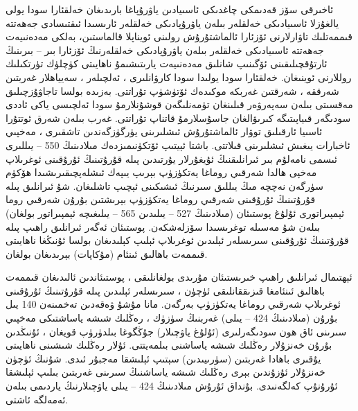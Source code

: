 \documentclass[a4paper]{article}
\begin{document}
ئاخىرقى سۆز قەدىمكى چاغدىكى ئاسىيادىن ياۋرۇپاغا بارىدىغان خەلقئارا سودا يولى يالغۇزلا ئاسىيادىكى خەلقلەر بىلەن ياۋرۇپادىكى خەلقلەر ئارىسىدا ئىقتىسادى جەھەتتە قىممەتلىك تاۋارلارنى ئۆزئارا ئالماشتۇرۇش رولىنى ئويناپلا قالماستىن، بەلكى مەدەنىيەت جەھەتتە ئاسىيادىكى خەلقلەر بىلەن ياۋرۇپادىكى خەلقلەرنىڭ ئۆزئارا بىر – بىرىنىڭ ئارتۇقچىلىقىنى ئۆگىنىپ شانلىق مەدەنىيەت يارىتىشىمۇ ناھايىتى كۈچلۈك تۈرتكىلىك روللارنى ئوينىغان. خەلقئارا سودا يولىدا سودا كارۋانلىرى ، ئەلچىلەر ، سەيياھلار غەربتىن شەرققە ، شەرقتىن غەربكە موكىدەك ئۆتۈشۈپ تۇراتتى. بەزىدە بولسا تاجاۋۇزچىلىق مەقسىتى بىلەن سەپەرۋەر قىلىنغان تۈمەنلىگەن قوشۇنلارمۇ سودا ئەلچىسى ياكى ئاددى سودىگەر قىياپىتىگە كىرىۋالغان جاسۇسلارمۇ قاتناپ تۇراتتى. غەرب بىلەن شەرق ئوتتۇرا ئاسىيا ئارقىلىق توۋار ئالماشتۇرۇش ئىشلىرىنى يۈرگۈزگەندىن تاشقىرى ، مەخپىي ئاخبارات يىغىش ئىشلىرىنى قىلاتتى. باشتا ئېيتىپ ئۆتكۈنىمىزدەك مىلادىنىڭ 550 – يىللىرى ئىسمى نامەلۇم بىر ئىرانلىقنىڭ ئۇيغۇرلار يۇرتىدىن پىلە قۇرۇتىنىڭ ئۇرۇقىنى ئوغرىلاپ مەخپى ھالدا شەرقىي روماغا يەتكۈزۈپ بېرىپ يىپەك ئىشلەپچىقىرىشىدا ھۆكۈم سۈرگەن نەچچە مىڭ يىللىق سىرنىڭ ئىشىكىنى ئېچىپ تاشلىغان. شۇ ئىرانلىق پىلە قۇرۇتىنىڭ ئۇرۇقىنى شەرقىي روماغا يەتكۈزۈپ بېرىشتىن بۇرۇن شەرقىي روما ئېمپىراتورى ئۇلۇغ پوستىئان (مىلادىنىڭ 527 – يىلىدىن 565 – يىلىغىچە ئېمپىراتور بولغان) بىلەن شۇ مەسىلە توغرىسىدا سۆزلەشكەن. پوستىئان ئەگەر ئىرانلىق راھىپ پىلە قۇرۇتىنىڭ ئۇرۇقىنى سىرىسلەر ئېلىدىن ئوغرىلاپ ئېلىپ كېلىدىغان بولسا ئۇنىڭغا ناھايىتى قىممەت باھالىق ئىنئام (مۇكاپات) بېرىدىغان بولغان.



ئېھتىمال ئىرانلىق راھىپ خىرىستىئان مۇرىدى بولغانلىقى ، پوستىئاندىن ئالىدىغان قىممەت باھالىق ئىنئامغا قىزىققانلىقى ئۈچۈن ، سىرىسلەر ئېلىدىن پىلە قۇرۇتىنىڭ ئۇرۇقىنى ئوغرىلاپ شەرقىي روماغا يەتكۈزۈپ بەرگەن. مانا مۇشۇ ۋەقەدىن تەخمىنەن 140 يىل بۇرۇن (مىلادىنىڭ 424 – يىلى) غەربنىڭ سۈزۈك ، رەڭلىك شىشە ياساشتىكى مەخپىي سىرىنى ئاق ھون سودىگەرلىرى (ئۇلۇغ ياۋچىلار) جۇڭگوغا بىلدۈرۈپ قويغان ، ئۇنىڭدىن بۇرۇن خەنزۇلار رەڭلىك شىشە ياساشنى بىلمەيتتى. ئۇلار رەڭلىك شىشىنى ناھايىتى يۇقىرى باھادا غەربتىن (سۈرىيىدىن) سېتىپ ئېلىشقا مەجبۇر ئىدى. شۇنىڭ ئۈچۈن خەنزۇلار ئۇزۇندىن بېرى رەڭلىك شىشە ياساشنىڭ سىرىنى غەربتىن بىلىپ ئېلىشقا ئۇرۇنۇپ كەلگەنىدى. بۇنداق ئۇرۇش مىلادىنىڭ 424 – يىلى ياۋچىلارنىڭ ياردىمى بىلەن ئەمەلگە ئاشتى.
\end{document}
